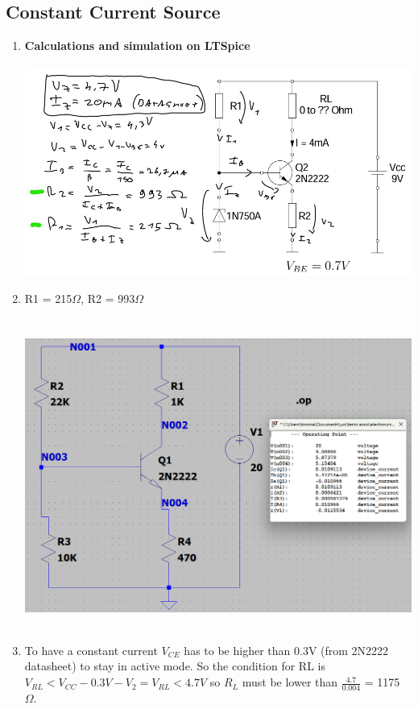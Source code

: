\documentclass{article}
\begin{document}
	\subsection{Constant Current Source}
	\begin{enumerate}
		\item \textbf{Calculations and simulation on LTSpice}\\\\
		\includegraphics[scale=0.55]{prelab 3/prelab 3 ex2 calc}\\
		\item R1 = 215\(\Omega\), R2 = 993\(\Omega\)\\\\\\
		\includegraphics[scale=0.6]{prelab 3/prelab 3 ex1 circuit}\\\\
		\item To have a constant current \(V_{CE}\) has to be higher than 0.3V (from 2N2222 datasheet) to stay in active mode. So the condition for RL is \(V_{RL} < V_{CC}-0.3V-V_2 = V_{RL} < 4.7V\) so \(R_L\) must be lower than \(\frac{4.7}{0.004} \) = 1175 \(\Omega\).\\\\

\end{enumerate}
\end{document}
